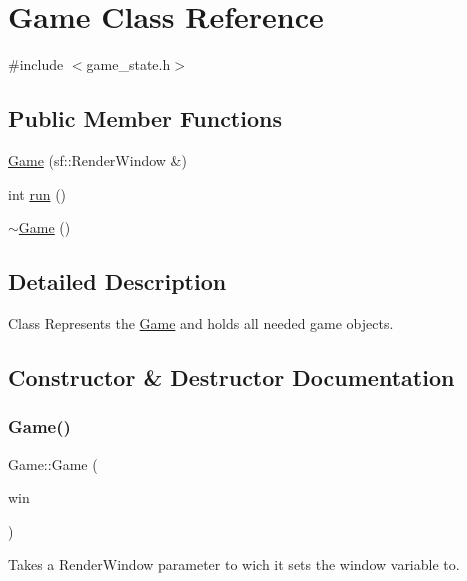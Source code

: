\hypertarget{classGame}{}\section{Game Class Reference}
\label{classGame}


{\ttfamily \#include $<$game\+\_\+state.\+h$>$}

\subsection*{Public Member Functions}
\begin{DoxyCompactItemize}
\item 
\hyperlink{classGame_a071ee8ba1e8d3874d369571fc21b1628}{Game} (sf\+::\+Render\+Window \&)
\item 
int \hyperlink{classGame_a99fb161fbbe87d25a8b73265a0611e58}{run} ()
\item 
\hyperlink{classGame_ae3d112ca6e0e55150d2fdbc704474530}{$\sim$\+Game} ()
\end{DoxyCompactItemize}


\subsection{Detailed Description}
Class Represents the \hyperlink{classGame}{Game} and holds all needed game objects. 

\subsection{Constructor \& Destructor Documentation}
\mbox{\label{classGame_a071ee8ba1e8d3874d369571fc21b1628}} 
\subsubsection{\texorpdfstring{Game()}{Game()}}
{\footnotesize\ttfamily Game\+::\+Game (\begin{DoxyParamCaption}\item[{sf\+::\+Render\+Window \&}]{win }\end{DoxyParamCaption})}

Takes a Render\+Window parameter to wich it sets the window variable to. \mbox{\label{classGame_ae3d112ca6e0e55150d2fdbc704474530}} 
